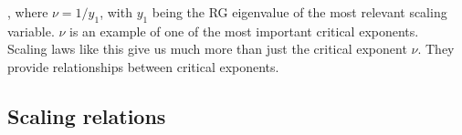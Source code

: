 \be 
\xi \propto {},
\ee 
where $\nu =1/y_1$, with $y_1$ being the RG eigenvalue of the most relevant scaling variable. $\nu$ is an example of one of the most important critical exponents.\\
Scaling laws like this give us much more than just the critical exponent $\nu$. They provide relationships between critical exponents.













\subsection{Scaling relations}

